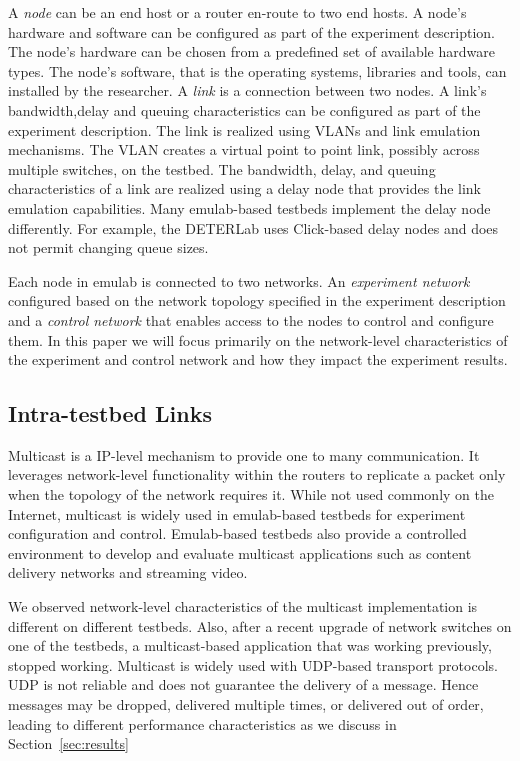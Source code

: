 A \emph{node} can be an end host or a router en-route to two end hosts. 
A node's hardware and software can be configured as part of the 
experiment description. 
The node's hardware can be chosen from a 
 predefined set of available hardware types. 
 The node's software, that is the operating systems, libraries and tools, 
  can installed by the researcher. 
A \emph{link} is a connection between two nodes. 
A link's bandwidth,delay and queuing characteristics can be configured 
 as part of the experiment description. 
The link is realized 
 using VLANs and link emulation mechanisms. 
The VLAN creates a virtual point to point link, possibly across multiple switches, 
 on the testbed.
The bandwidth, delay, and queuing characteristics of a link 
 are realized using a delay node that provides the 
 link emulation capabilities. 
Many emulab-based testbeds 
 implement the delay node differently.
For example, the DETERLab uses  
  Click-based delay nodes and does 
 not permit changing queue sizes. 
 
Each node in emulab is connected to two networks.
An \emph{experiment network} configured based on the network topology 
specified in the experiment description and a \emph{control network} that 
enables access to the nodes to control and configure them. 
In this paper we will focus primarily on the network-level characteristics
 of the experiment and control network and how 
  they impact the experiment results. 

\subsection{Intra-testbed Links} 
Multicast is a IP-level mechanism to provide one to many communication. 
It leverages network-level functionality within the routers to 
  replicate a packet only when the topology of the network requires it. 
While not used commonly on the Internet, 
 multicast is widely used in emulab-based testbeds for experiment configuration 
 and control.
 Emulab-based testbeds also provide a controlled environment to develop 
 and evaluate multicast applications such as content delivery networks and streaming 
video.  

We observed network-level characteristics of the multicast implementation 
 is different on different testbeds. 
Also, after a recent upgrade of network switches on one of the testbeds, 
 a multicast-based application that was working previously, stopped working. 
Multicast is widely used with UDP-based transport protocols. 
UDP is not reliable and does not guarantee the delivery of a message. 
Hence messages may be dropped, delivered multiple times, or delivered out of order, 
 leading to different performance characteristics as 
 we discuss in Section~\ref{sec:results}


